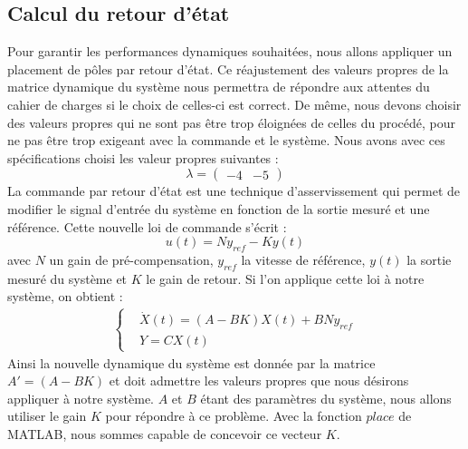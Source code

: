 \subsection{Calcul du retour d'état}
\label{sub:Calcul du retour etat}
Pour garantir les performances dynamiques souhaitées, nous allons appliquer un placement de pôles par retour d'état. Ce réajustement des valeurs propres de la matrice dynamique du système nous permettra de répondre aux attentes du cahier de charges si le choix de celles-ci est correct. De même, nous devons choisir des valeurs propres qui ne sont pas être trop éloignées de celles du procédé, pour ne pas être trop exigeant avec la commande et le système. Nous avons avec ces spécifications choisi les valeur propres suivantes :
\begin{equation}
\label{equation:valeurPropres}
\lambda = \begin{pmatrix}
-4 &-5
\end{pmatrix}
\end{equation}
La commande par retour d'état est une technique d'asservissement qui permet de modifier le signal d'entrée du système en fonction de la sortie mesuré et une référence. Cette nouvelle loi de commande s'écrit : 
\begin{equation}
u(t) = Ny_{ref}-Ky(t)
\end{equation} avec $N$ un gain de pré-compensation, $y_{ref}$ la vitesse de référence, $y(t)$ la sortie mesuré du système et $K$ le gain de retour. Si l'on applique cette loi à notre système, on obtient : 
\begin{align*}
\left\lbrace
\begin{aligned}
&\dot{X}(t) = (A-BK)X(t) + BNy_{ref}\\
&Y = CX(t)
\end{aligned}
\right.
\end{align*}
Ainsi la nouvelle dynamique du système est donnée par la matrice $A' = (A-BK)$ et doit admettre les valeurs propres que nous désirons appliquer à notre système. $A$ et $B$ étant des paramètres du système, nous allons utiliser le gain $K$ pour répondre à ce problème. Avec la fonction $place$ de MATLAB, nous sommes capable de concevoir ce vecteur $K$. 

